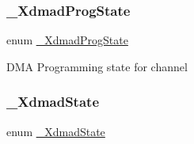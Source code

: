 \subsubsection{\texorpdfstring{\_XdmadProgState}{\_XdmadProgState}}
{\footnotesize\ttfamily enum \mbox{\hyperlink{group__dmad__structs_gaea9ca6ac14cc448af9be1515bd2205c5}{\+\_\+\+Xdmad\+Prog\+State}}}

D\+MA Programming state for channel \mbox{\label{group__dmad__structs_gab11875bdf8f31a2c76972640dcf13d89}} 
\subsubsection{\texorpdfstring{\_XdmadState}{\_XdmadState}}
{\footnotesize\ttfamily enum \mbox{\hyperlink{group__dmad__structs_gab11875bdf8f31a2c76972640dcf13d89}{\+\_\+\+Xdmad\+State}}}

